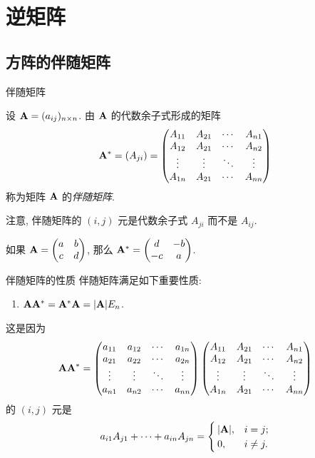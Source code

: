 \section{逆矩阵}

\subsection{方阵的伴随矩阵}

\begin{frame}{伴随矩阵}
	\onslide<+->
	\begin{definition}
		设 ${\mathbf{A}}=(a_{ij})_{n\times n}$.
		由 ${\mathbf{A}}$ 的代数余子式形成的矩阵
		\[{\mathbf{A}}^*=(A_{ji})=\begin{pmatrix}
			A_{11}&A_{21}&\cdots&A_{n1}\\
			A_{12}&A_{21}&\cdots&A_{n2}\\
			\vdots&\vdots&\ddots&\vdots\\
			A_{1n}&A_{21}&\cdots&A_{nn}
		\end{pmatrix}\]
		称为矩阵 ${\mathbf{A}}$ 的\emph{伴随矩阵}.
	\end{definition}
	\onslide<+->
	注意, 伴随矩阵的 $(i,j)$ 元是代数余子式 \alert{$A_{ji}$ 而不是 $A_{ij}$}.
	\onslide<+->
	\begin{example}
		如果 ${\mathbf{A}}=\begin{pmatrix}
			a&b\\c&d
		\end{pmatrix}$, 那么 ${\mathbf{A}}^*=\begin{pmatrix}
			d&-b\\-c&a
		\end{pmatrix}$.
	\end{example}
\end{frame}


\begin{frame}{伴随矩阵的性质}
	\onslide<+->
	伴随矩阵满足如下重要性质:
	\begin{alertblock@}
		\begin{enumerate}
		\item ${\mathbf{A}}{\mathbf{A}}^*={\mathbf{A}}^*{\mathbf{A}}=|{\mathbf{A}}|E_n$.
		\end{enumerate}
	\end{alertblock@}
	\onslide<+->
	这是因为
	\[{\mathbf{A}}{\mathbf{A}}^*=\begin{pmatrix}
		a_{11}&a_{12}&\cdots &a_{1n}\\
		a_{21}&a_{22}&\cdots &a_{2n}\\
		\vdots&\vdots&\ddots&\vdots\\
		a_{n1}&a_{n2}&\cdots &a_{nn}
	\end{pmatrix}\begin{pmatrix}
		A_{11}&A_{21}&\cdots&A_{n1}\\
		A_{12}&A_{21}&\cdots&A_{n2}\\
		\vdots&\vdots&\ddots&\vdots\\
		A_{1n}&A_{21}&\cdots&A_{nn}
	\end{pmatrix}\]
	的 $(i,j)$ 元是
	\[a_{i1}A_{j1}+\cdots+a_{in}A_{jn}=\begin{cases}
		|{\mathbf{A}}|,&i=j;\\
		0,&i\neq j.
	\end{cases}\]
\end{frame}


